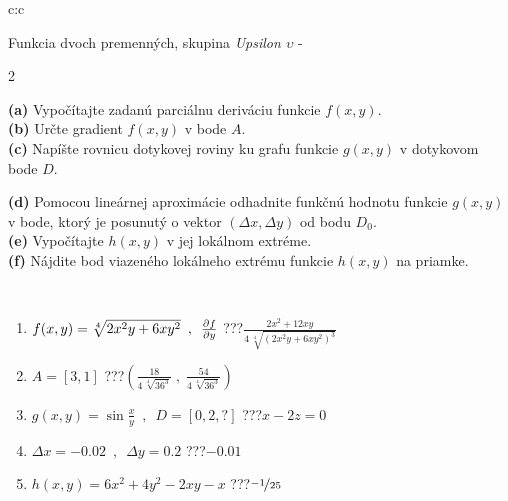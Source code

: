 \documentclass[10pt]{report}
\begin{document}
\begin{tabular}{c:c}
\begin{minipage}[c][104.5mm][t]{0.5\linewidth}
\begin{center}
\vspace{7mm}
{\huge \LARGE Funkcia dvoch premenných, skupina \textit{Upsilon $\upsilon$} -}\\[5mm]
\begin{minipage}{0.95\linewidth}
\begin{center}
{\small \begin{multicols}{2} \raggedright
\textbf{(a)} Vypočítajte zadanú parciálnu deriváciu funkcie \(f(x,y)\). \\[1mm]
\textbf{(b)} Určte gradient \(f(x,y)\) v bode \(A\). \\[1mm]
\textbf{(c)} Napíšte rovnicu dotykovej roviny ku grafu funkcie \(g(x,y)\) v dotykovom bode \(D\). \par \columnbreak
\textbf{(d)} Pomocou lineárnej aproximácie odhadnite funkčnú hodnotu funkcie \(g(x,y)\) v bode, ktorý je posunutý o vektor \((\Delta x, \Delta y)\) od bodu \(D_0\). \\[1mm]
\textbf{(e)} Vypočítajte \(h(x,y)\) v jej lokálnom extréme. \\[1mm]
\textbf{(f)} Nájdite bod viazeného lokálneho extrému funkcie \(h(x,y)\) na priamke. \\[1mm]
\end{multicols}
}
\end{center}
\end{minipage}
\\[4mm]
\begin{minipage}{0.79\linewidth}
\begin{center}
\begin{varwidth}{\linewidth}
\begin{enumerate}
\normalsizerr
\item $f(x,y) = \sqrt[4]{2x^2y + 6xy^2}\enspace , \enspace \pdv{f}{y}$\quad \dotfill\; ???\;\dotfill \quad $\frac{2x^2+12xy}{4\,\sqrt[4]{(2x^2y+6xy^2)^{3}}}$
\item $A = [3, 1]$\quad \dotfill\; ???\;\dotfill \quad $\left( \frac{18}{4\,\sqrt[4]{36^3}} \;,\; \frac{54}{4\,\sqrt[4]{36^3}} \right)$
\item $g(x,y) = \sin\frac{x}{y} \enspace , \enspace D = [0, 2, ?]$\quad \dotfill\; ???\;\dotfill \quad $x-2z=0$
\item $\Delta x = {-0.02} \enspace,\enspace \Delta y = {0.2}$\quad \dotfill\; ???\;\dotfill \quad $-0.01$
\item $h(x,y) = 6x^2+4y^2-2xy-x$\quad \dotfill\; ???\;\dotfill \quad $\nicefrac{-1}{25}$

\end{enumerate}
\end{varwidth}
\end{center}
\end{minipage}
\end{center}
\end{minipage}
\end{tabular}
\end{document}
